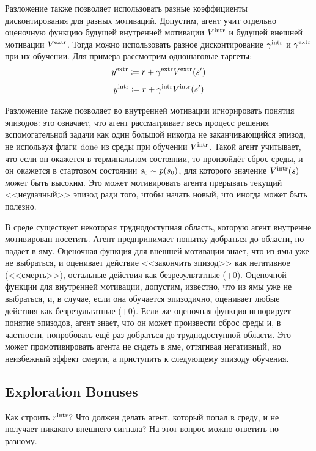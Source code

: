 Разложение также позволяет использовать разные коэффициенты дисконтирования для разных мотиваций. Допустим, агент учит отдельно оценочную функцию будущей внутренней мотивации $V^{\mathrm{intr}}$ и будущей внешней мотивации $V^{\mathrm{extr}}$. Тогда можно использовать разное дисконтирование $\gamma^{\mathrm{intr}}$ и $\gamma^{\mathrm{extr}}$ при их обучении. Для примера рассмотрим одношаговые таргеты:
$$y^{\mathrm{extr}} \coloneqq r + \gamma^{\mathrm{extr}} V^{\mathrm{extr}}(s')$$
$$y^{\mathrm{intr}} \coloneqq r + \gamma^{\mathrm{intr}} V^{\mathrm{intr}}(s')$$

Разложение также позволяет во внутренней мотивации игнорировать понятия эпизодов: это означает, что агент рассматривает весь процесс решения вспомогательной задачи как один большой никогда не заканчивающийся эпизод, не используя флаги $\mathrm{done}$ из среды при обучении $V^{\mathrm{intr}}$. Такой агент учитывает, что если он окажется в терминальном состоянии, то произойдёт сброс среды, и он окажется в стартовом состоянии $s_0 \HM\sim p(s_0)$, для которого значение $V^{\mathrm{intr}}(s)$ может быть высоким. Это может мотивировать агента прерывать текущий <<неудачный>> эпизод ради того, чтобы начать новый, что иногда может быть полезно.

\vspace{0.2cm}
\begin{example}
В среде существует некоторая труднодоступная область, которую агент внутренне мотивирован посетить. Агент предпринимает попытку добраться до области, но падает в яму. Оценочная функция для внешней мотивации знает, что из ямы уже не выбраться, и оценивает действие <<закончить эпизод>> как негативное (<<смерть>>), остальные действия как безрезультатные (+0). Оценочной функции для внутренней мотивации, допустим, известно, что из ямы уже не выбраться, и, в случае, если она обучается эпизодично, оценивает любые действия как безрезультатные (+0). Если же оценочная функция игнорирует понятие эпизодов, агент знает, что он может произвести сброс среды и, в частности, попробовать ещё раз добраться до труднодоступной области. Это может промотивировать агента не сидеть в яме, оттягивая негативный, но неизбежный эффект смерти, а приступить к следующему эпизоду обучения.
\end{example}

\subsection{Exploration Bonuses}

Как строить $r^{\mathrm{intr}}$? Что должен делать агент, который попал в среду, и не получает никакого внешнего сигнала? На этот вопрос можно ответить по-разному.

